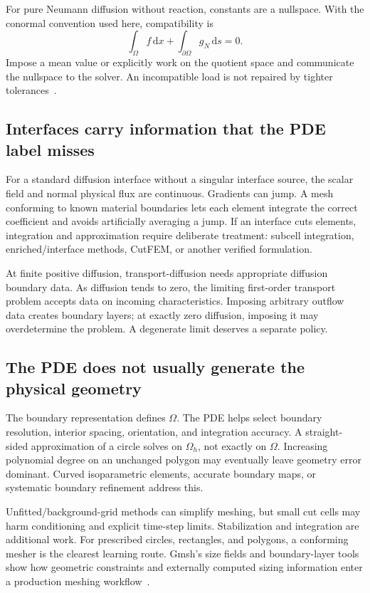 \documentclass[11pt,a4paper]{article}
\newcommand{\dd}{\,\mathrm{d}}
\begin{document}
For pure Neumann diffusion without reaction, constants are a nullspace. With the conormal convention used here, compatibility is
\begin{equation}
\int_\Omega f\dd x+\int_{\partial\Omega}g_N\dd s=0.
\end{equation}
Impose a mean value or explicitly work on the quotient space and communicate the nullspace to the solver. An incompatible load is not repaired by tighter tolerances~\cite{femstability,petscnull}.

\subsection{Interfaces carry information that the PDE label misses}
For a standard diffusion interface without a singular interface source, the scalar field and normal physical flux are continuous. Gradients can jump. A mesh conforming to known material boundaries lets each element integrate the correct coefficient and avoids artificially averaging a jump. If an interface cuts elements, integration and approximation require deliberate treatment: subcell integration, enriched/interface methods, CutFEM, or another verified formulation.

At finite positive diffusion, transport-diffusion needs appropriate diffusion boundary data. As diffusion tends to zero, the limiting first-order transport problem accepts data on incoming characteristics. Imposing arbitrary outflow data creates boundary layers; at exactly zero diffusion, imposing it may overdetermine the problem. A degenerate limit deserves a separate policy.

\subsection{The PDE does not usually generate the physical geometry}
The boundary representation defines $\Omega$. The PDE helps select boundary resolution, interior spacing, orientation, and integration accuracy. A straight-sided approximation of a circle solves on $\Omega_h$, not exactly on $\Omega$. Increasing polynomial degree on an unchanged polygon may eventually leave geometry error dominant. Curved isoparametric elements, accurate boundary maps, or systematic boundary refinement address this.

Unfitted/background-grid methods can simplify meshing, but small cut cells may harm conditioning and explicit time-step limits. Stabilization and integration are additional work. For prescribed circles, rectangles, and polygons, a conforming mesher is the clearest learning route. Gmsh's size fields and boundary-layer tools show how geometric constraints and externally computed sizing information enter a production meshing workflow~\cite{gmsh}.
\end{document}

